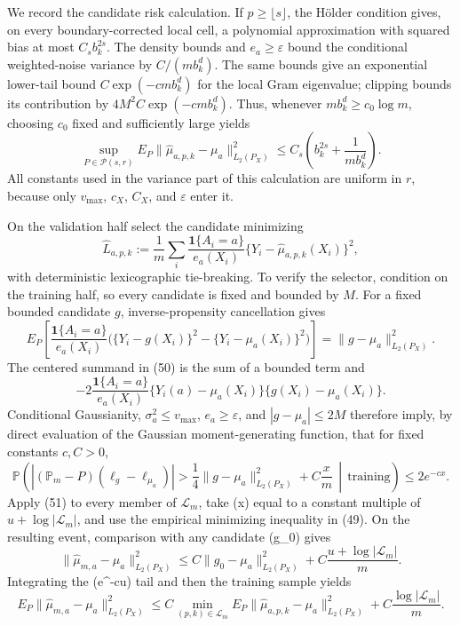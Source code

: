 We record the candidate risk calculation.  If \(p\geq\lfloor s\rfloor\), the Hölder condition gives, on every boundary-corrected local cell, a polynomial approximation with squared bias at most \(C_s b_k^{2s}\).  The density bounds and \(e_a\geq\varepsilon\) bound the conditional weighted-noise variance by \(C/(m b_k^d)\).  The same bounds give an exponential lower-tail bound \(C\exp(-c m b_k^d)\) for the local Gram eigenvalue; clipping bounds its contribution by \(4M^2C\exp(-c m b_k^d)\).  Thus, whenever \(m b_k^d\geq c_0\log m\), choosing \(c_0\) fixed and sufficiently large yields
\[
\sup_{P\in\mathcal P(s,r)}
E_P\|\widehat\mu_{a,p,k}-\mu_a\|_{L_2(P_X)}^2
\leq C_s\left(b_k^{2s}+\frac{1}{m b_k^d}\right).
\tag{48}
\]
All constants used in the variance part of this calculation are uniform in \(r\), because only \(v_{\max}\), \(c_X\), \(C_X\), and \(\varepsilon\) enter it.

On the validation half select the candidate minimizing
\[
\widehat L_{a,p,k}
:=\frac1m\sum_{i}
\frac{\mathbf 1\{A_i=a\}}{e_a(X_i)}
\{Y_i-\widehat\mu_{a,p,k}(X_i)\}^2,
\tag{49}
\]
with deterministic lexicographic tie-breaking.  To verify the selector, condition on the training half, so every candidate is fixed and bounded by \(M\).  For a fixed bounded candidate \(g\), inverse-propensity cancellation gives
\[
E_P\!\left[
\frac{\mathbf 1\{A_i=a\}}{e_a(X_i)}
\bigl(\{Y_i-g(X_i)\}^2-\{Y_i-\mu_a(X_i)\}^2\bigr)
\right]
=\|g-\mu_a\|_{L_2(P_X)}^2.
\tag{50}
\]
The centered summand in (50) is the sum of a bounded term and
\[
-2\frac{\mathbf 1\{A_i=a\}}{e_a(X_i)}
\{Y_i(a)-\mu_a(X_i)\}\{g(X_i)-\mu_a(X_i)\}.
\]
Conditional Gaussianity, \(\sigma_a^2\leq v_{\max}\), \(e_a\geq\varepsilon\), and \(|g-\mu_a|\leq2M\) therefore imply, by direct evaluation of the Gaussian moment-generating function, that for fixed constants \(c,C>0\),
\[
\mathbb P\!\left(
|(\mathbb P_m-P)(\ell_g-\ell_{\mu_a})|
>\frac14\|g-\mu_a\|_{L_2(P_X)}^2+C\frac{x}{m}
\,\middle|\,\text{training}
\right)
\leq 2e^{-cx}.
\tag{51}
\]
Apply (51) to every member of \(\mathcal L_m\), take (x) equal to a constant multiple of \(u+\log|\mathcal L_m|\), and use the empirical minimizing inequality in (49).  On the resulting event, comparison with any candidate (g_0) gives
\[
\|\widehat\mu_{m,a}-\mu_a\|_{L_2(P_X)}^2
\leq C\|g_0-\mu_a\|_{L_2(P_X)}^2
+C\frac{u+\log|\mathcal L_m|}{m}.
\]
Integrating the (e^{-cu}) tail and then the training sample yields
\[
E_P\|\widehat\mu_{m,a}-\mu_a\|_{L_2(P_X)}^2
\leq C\min_{(p,k)\in\mathcal L_m}
E_P\|\widehat\mu_{a,p,k}-\mu_a\|_{L_2(P_X)}^2
+C\frac{\log|\mathcal L_m|}{m}.
\tag{52}
\]

